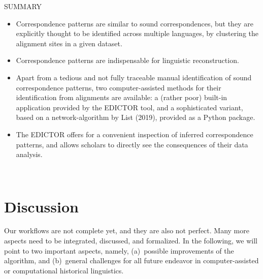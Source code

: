 \documentclass[xetex,svgnames]{scrartcl}
\begin{document}
\begin{center}
  \hline
  SUMMARY \\\hline
  \begin{itemize}
    \item Correspondence patterns are similar to sound correspondences, but they are explicitly
      thought to be identified across multiple languages, by clustering the alignment sites in a
      given dataset.
    \item Correspondence patterns are indispensable for linguistic reconstruction.
    \item Apart from a tedious and not fully traceable manual identification of sound correspondence
      patterns, two computer-assisted methods for their identification from alignments are
      available: a (rather poor) built-in application provided by the EDICTOR tool, and a
      sophisticated variant, based on a network-algorithm by List (2019), provided as a Python
      package.
    \item The EDICTOR offers for a convenient inspection of inferred correspondence patterns, and
      allows scholars to directly see the consequences of their data analysis.
  \end{itemize}\\\hline
  \endtabular
\end{center}



\section{Discussion}

Our workflows are not complete yet, and they are also not perfect. Many more aspects need to be
integrated, discussed, and formalized. In the following, we will point to two important aspects,
namely, (a)~possible improvements of the algorithm, and (b)~general challenges for all future
endeavor in computer-assisted or computational historical linguistics.
\end{document}
